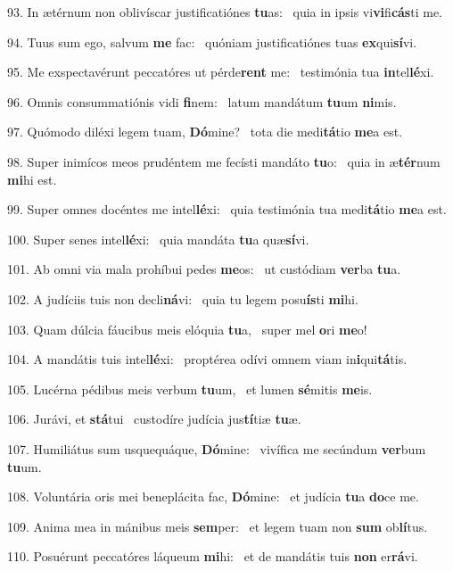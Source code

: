 93. In ætérnum non oblivíscar justificatiónes \textbf{tu}as: \ast\  quia in ipsis vi\textbf{vi}fi\textbf{cás}ti me.\

94. Tuus sum ego, salvum \textbf{me} fac: \ast\  quóniam justificatiónes tuas \textbf{ex}qui\textbf{sí}vi.\

95. Me exspectavérunt peccatóres ut pérde\textbf{rent} me: \ast\  testimónia tua \textbf{in}tel\textbf{lé}xi.\

96. Omnis consummatiónis vidi \textbf{fi}nem: \ast\  latum mandátum \textbf{tu}um \textbf{ni}mis.\

97. Quómodo diléxi legem tuam, \textbf{Dó}mine? \ast\  tota die medi\textbf{tá}tio \textbf{me}a est.\

98. Super inimícos meos prudéntem me fecísti mandáto \textbf{tu}o: \ast\  quia in æ\textbf{tér}num \textbf{mi}hi est.\

99. Super omnes docéntes me intel\textbf{lé}xi: \ast\  quia testimónia tua medi\textbf{tá}tio \textbf{me}a est.\

100. Super senes intel\textbf{lé}xi: \ast\  quia mandáta \textbf{tu}a quæ\textbf{sí}vi.\

101. Ab omni via mala prohíbui pedes \textbf{me}os: \ast\  ut custódiam \textbf{ver}ba \textbf{tu}a.\

102. A judíciis tuis non decli\textbf{ná}vi: \ast\  quia tu legem posu\textbf{ís}ti \textbf{mi}hi.\

103. Quam dúlcia fáucibus meis elóquia \textbf{tu}a, \ast\  super mel \textbf{o}ri \textbf{me}o!\

104. A mandátis tuis intel\textbf{lé}xi: \ast\  proptérea odívi omnem viam in\textbf{i}qui\textbf{tá}tis.\

105. Lucérna pédibus meis verbum \textbf{tu}um, \ast\  et lumen \textbf{sé}mitis \textbf{me}is.\

106. Jurávi, et \textbf{stá}tui \ast\  custodíre judícia jus\textbf{tí}tiæ \textbf{tu}æ.\

107. Humiliátus sum usquequáque, \textbf{Dó}mine: \ast\  vivífica me secúndum \textbf{ver}bum \textbf{tu}um.\

108. Voluntária oris mei beneplácita fac, \textbf{Dó}mine: \ast\  et judícia \textbf{tu}a \textbf{do}ce me.\

109. Anima mea in mánibus meis \textbf{sem}per: \ast\  et legem tuam non \textbf{sum} ob\textbf{lí}tus.\

110. Posuérunt peccatóres láqueum \textbf{mi}hi: \ast\  et de mandátis tuis \textbf{non} er\textbf{rá}vi.\

